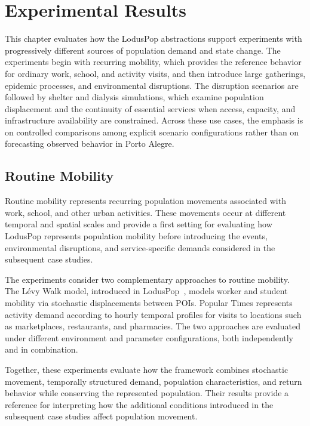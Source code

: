 \chapter{Experimental Results}
\label{chap:experimental_results}

This chapter evaluates how the LodusPop abstractions support experiments with progressively different sources of population demand and state change. The experiments begin with recurring mobility, which provides the reference behavior for ordinary work, school, and activity visits, and then introduce large gatherings, epidemic processes, and environmental disruptions. The disruption scenarios are followed by shelter and dialysis simulations, which examine population displacement and the continuity of essential services when access, capacity, and infrastructure availability are constrained. Across these use cases, the emphasis is on controlled comparisons among explicit scenario configurations rather than on forecasting observed behavior in Porto Alegre.

\section{Routine Mobility}
\label{sec:results_routine_mobility}

Routine mobility represents recurring population movements associated with work, school, and other urban activities. These movements occur at different temporal and spatial scales and provide a first setting for evaluating how LodusPop represents population mobility before introducing the events, environmental disruptions, and service-specific demands considered in the subsequent case studies.

The experiments consider two complementary approaches to routine mobility. The Lévy Walk model, introduced in LodusPop~\cite{silva2026lodusPop}, models worker and student mobility via stochastic displacements between POIs. Popular Times represents activity demand according to hourly temporal profiles for visits to locations such as marketplaces, restaurants, and pharmacies. The two approaches are evaluated under different environment and parameter configurations, both independently and in combination.

Together, these experiments evaluate how the framework combines stochastic movement, temporally structured demand, population characteristics, and return behavior while conserving the represented population. Their results provide a reference for interpreting how the additional conditions introduced in the subsequent case studies affect population movement.

